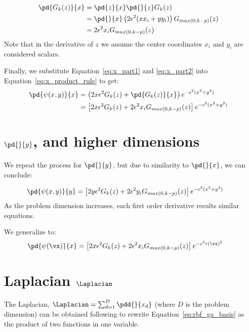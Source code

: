 \documentclass[11pt]{report}
\begin{document}
{\begin{align}
\pd{G_k(z)}{x} & = \pd{z}{x} \pd{}{z} G_k(z) \nonumber \\
               & = \pd{}{x} \left( 2\epsilon^2(x x_i + y y_i) \right) G_{max(0,k-p)}(z) \nonumber \\ 
               & = 2 \epsilon^2 x_i G_{max(0,k-p)}( z ) \label{eq:x_part2}
\end{align}
Note that in the derivative of $z$ we assume the center coordinates $x_i$ and $y_i$ are considered scalars. 


Finally, we substitute Equation~\ref{eq:x_part1} and \ref{eq:x_part2} into Equation~\ref{eq:x_product_rule} to get:
\begin{align}
\pd{\psi(x,y)}{x} & = \left( 2x\epsilon^2 G_k(z) + \pd{G_k(z)}{x} \right) e^{-\epsilon^2(x^2 + y^2)} \nonumber \\
                 & = \left[ 2x\epsilon^2 G_k(z) + 2 \epsilon^2 x_i G_{max(0,k-p)}( z )  \right] e^{-\epsilon^2(x^2 + y^2)} \label{eq:rbf_ga_xderiv}
\end{align}


\section{$\pd{}{y}$, and higher dimensions}

We repeat the process for $\pd{}{y}$, but due to similarity to $\pd{}{x}$, we can conclude: 

\begin{align}
\pd{\psi(x,y)}{y}   & = \left[ 2y\epsilon^2 G_k(z) + 2 \epsilon^2 y_i G_{max(0,k-p)}( z )  \right] e^{-\epsilon^2(x^2 + y^2)} \label{eq:rbf_ga_yderiv}
\end{align}
As the problem dimension increases, each first order derivative results similar equations.

We generalize to:
\begin{align}
\pd{\psi(\vx)}{x}   & = \left[ 2 x \epsilon^2 G_k(z) + 2 \epsilon^2 x_i G_{max(0,k-p)}( z )  \right] e^{-\epsilon^2 r(\vx)^2} \label{eq:rbf_ga_yderiv}
\end{align}


\section{Laplacian $\Laplacian$}

The Laplacian, $\Laplacian = \sum_{d=1}^{D}  \pdd{}{x_d}$ (where $D$ is the problem dimension) can be obtained following \cite{FornbergLehtoPowell12} to rewrite Equation~\ref{eq:rbf_ga_basis} as the product of two functions in one variable. 

}
\end{document}
